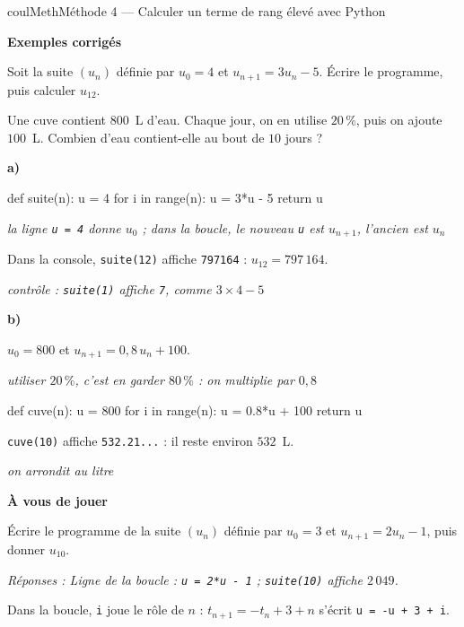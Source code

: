 \documentclass[11pt,a4paper]{article}
\makeatletter
\newcounter{lycee@signet}
\newcommand{\signet}[3][]{\stepcounter{lycee@signet}%
  \edef\lycee@dest{\if\relax\detokenize{#1}\relax
    signet.\arabic{lycee@signet}\else#1\fi}%
  \hypertarget{\lycee@dest}{}\bookmark[level=#2,dest=\lycee@dest]{#3}}
\newcommand{\res}[1]{#1}
\newcounter{methode}
\newenvironment{methodebox}[1][Méthode]{\stepcounter{methode}%
  \begin{boitecours}[phantom={\signet[methode-\arabic{methode}]{2}{#1}}]{coulMeth}{#1}}%
  {\end{boitecours}}
\newcommand{\etape}[1]{\par\smallskip\textbf{\color{coulMeth}#1}\par\nobreak\smallskip}
\newcommand{\reponse}[1]{\par\smallskip
  {\footnotesize\itshape\color{black!55}Réponses : #1}}
\newcommand{\explique}[2]{\par\smallskip\noindent
  \begin{minipage}[t]{0.57\linewidth}\raggedright #1\end{minipage}\hfill
  \begin{minipage}[t]{0.40\linewidth}\raggedright\leavevmode
    {\small\itshape\color{black!60}#2}\end{minipage}\par}
\newcommand{\cas}[1]{\par\smallskip\noindent\textbf{\color{coulExo}#1}\vadjust{\nobreak}}
\newenvironment{correction}{\par}{\par}
\newcommand{\etapeexemples}{\etape{Exemples corrigés}}
\makeatother
\begin{document}
\begin{methodebox}[Méthode 4 --- Calculer un terme de rang élevé avec Python]
\etapeexemples
\begin{questions}[label=\alph*)]
  \item Soit la suite $(u_{n})$ définie par $u_{0}=4$ et $u_{n+1}=3u_{n}-5$. Écrire le programme, puis calculer
        $u_{12}$.
  \item Une cuve contient $800$~L d'eau. Chaque jour, on en utilise $20\,\%$, puis on
        ajoute $100$~L. Combien d'eau contient-elle au bout de $10$ jours ?
\end{questions}
\begin{correction}
\cas{a)}\par\nopagebreak
\noindent
\begin{minipage}[t]{0.42\linewidth}\vspace{0pt}
\begin{python}
def suite(n):
    u = 4
    for i in range(n):
        u = 3*u - 5
    return u
\end{python}
\end{minipage}\hfill
\begin{minipage}[t]{0.54\linewidth}\vspace{0pt}\raggedright
{\small\itshape\color{black!60}la ligne \texttt{u = 4} donne $u_{0}$ ; dans la boucle, le
nouveau \texttt{u} est $u_{n+1}$, l'ancien est $u_{n}$}
\end{minipage}
\explique{Dans la console, \texttt{suite(12)} affiche \texttt{797164} : $u_{12}=\res{797\,164}$.}{%
contrôle : \texttt{suite(1)} affiche \texttt{7}, comme $3\times 4-5$}
\cas{b)}
\explique{$u_{0}=800$ et $u_{n+1}=0{,}8\,u_{n}+100$.}{utiliser $20\,\%$, c'est en garder
$80\,\%$ : on multiplie par $0{,}8$}
\begin{python}
def cuve(n):
    u = 800
    for i in range(n):
        u = 0.8*u + 100
    return u
\end{python}
\explique{\texttt{cuve(10)} affiche \texttt{532.21...} : il reste environ \res{$532$~L}.}{on
arrondit au litre}
\end{correction}

\etape{À vous de jouer}
Écrire le programme de la suite $(u_{n})$ définie par $u_{0}=3$ et $u_{n+1}=2u_{n}-1$, puis donner
$u_{10}$.
\reponse{Ligne de la boucle : \texttt{u = 2*u - 1} ; \texttt{suite(10)} affiche
$2\,049$.}
\end{methodebox}

\begin{remarquebox}
Dans la boucle, \texttt{i} joue le rôle de $n$ : $t_{n+1}=-t_{n}+3+n$ s'écrit
\texttt{u = -u + 3 + i}.
\end{remarquebox}
\end{document}
